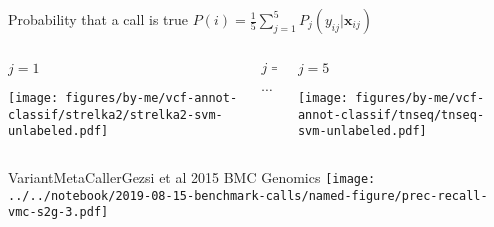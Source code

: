 \documentclass{beamer}
\begin{document}
\begin{frame}
\small
\begin{center}
Probability that a call is true
\(
P(i) = \frac{1}{5} \sum_{j=1}^5 P_j(y_{ij} | \mathbf{x}_{ij})
\)
\end{center}
\begin{columns}[t]
\begin{column}{0.33\textwidth}
\begin{center}
\(j=1\)
\end{center}

\texttt{[image: figures/by-me/vcf-annot-classif/strelka2/strelka2-svm-unlabeled.pdf]}
\end{column}

\begin{column}{0.33\textwidth}
\begin{center}
\(j=...\)

\vspace{0.7in}
\large
\(\cdots\)
\normalsize
\end{center}
\end{column}

\begin{column}{0.33\textwidth}
\begin{center}
\(j=5\)
\end{center}

\texttt{[image: figures/by-me/vcf-annot-classif/tnseq/tnseq-svm-unlabeled.pdf]}
\end{column}
\end{columns}
\end{frame}


\begin{frame}{VariantMetaCaller}{Gezsi et al 2015 BMC Genomics}
\texttt{[image: ../../notebook/2019-08-15-benchmark-calls/named-figure/prec-recall-vmc-s2g-3.pdf]}
\end{frame}

\end{document}
